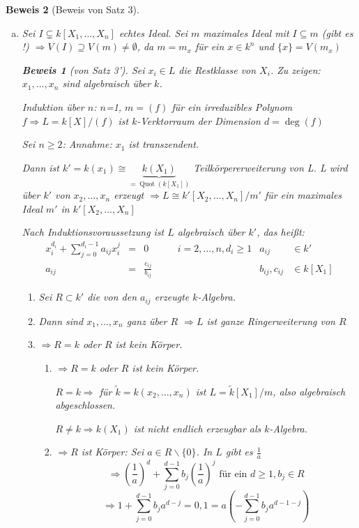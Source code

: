 \documentclass[a4paper, 12pt, numbers=noendperiod, chapterprefix=true]{scrbook}
\theoremstyle{break}
\theoremstyle{nonumberbreak}
\newtheorem{Bew}{Beweis}
\theoremstyle{nonumberplain}
\DeclareMathOperator{\Quot}{Quot}
\begin{document}
\begin{Bew}[Beweis von Satz 3]\begin{enumerate}[a)]
\item
	Sei $I\subsetneq k[X_1,\dots ,X_n]$ echtes Ideal. Sei $m$ maximales Ideal mit $I\subseteq m$ (gibt es !) $\Rightarrow V(I) \supseteq V(m) \neq \emptyset$, da $m=m_x$ f\"ur ein $x\in k^n$ und $\{x\}=V(m_x)$
	
	\begin{Bew}[von Satz 3']
	Sei $x_i\in L$ die Restklasse von $X_i$. \emph{Zu zeigen:} $x_1,\dots ,x_n$ sind algebraisch \"uber $k$.
	
	\emph{Induktion \"uber $n$:} $n$=1, $m=(f)$ f\"ur ein irreduzibles Polynom $f \Rightarrow L=k[X]/(f)$ ist $k$-Verktorraum der Dimension $d= \deg(f)$
	
	Sei $n\geq 2$: \emph{Annahme:} $x_1$ ist transzendent.
	
	Dann ist $k'=k(x_1) \cong \underbrace{k(X_1)}_{=\Quot{(k[X_1])}}$ Teilk\"orpererweiterung von L. L wird \"uber $k'$ von $x_2,\dots ,x_n$ erzeugt $\Rightarrow L \cong k'[X_2,\dots ,X_n]/m'$ f\"ur ein maximales Ideal $m'$ in $k'[X_2,\dots ,X_n]$
	
	Nach Induktionsvoraussetzung ist $L$ algebraisch \"uber $k'$, das hei\ss t:
	\[\begin{array}{rclccrl}
		x_i^{d_i} + \sum\limits_{j=0}^{d_i-1} a_{ij}x_i^j &=& 0 & \quad & i=2,\dots ,n, d_i \geq1 & a_{ij} &\in k'\\
		a_{ij} &=& \frac{c_{ij}}{b_{ij}} & \quad & & b_{ij}, c_{ij} &\in k[X_1]
	\end{array}\]
	\end{Bew}

	\begin{enumerate}[(1)]
	\item Sei $R\subset k'$ die von den $a_{ij}$ erzeugte $k$-Algebra.
	\item Dann sind $x_1,\dots ,x_n$ ganz \"uber $R$ $\Rightarrow L$ ist ganze Ringerweiterung von $R$
	\item $\Rightarrow R=k$ oder $R$ ist kein K\"orper.
	\begin{enumerate}[(1)]
	\item $\Rightarrow R=k$ oder $R$ ist kein K\"orper.
	
		$R=k \Rightarrow $ f\"ur $\tilde k=k(x_2,\dots ,x_n)$ ist $L= \tilde k[X_1]/m$, also algebraisch abgeschlossen.
		
		$R\neq k \Rightarrow k(X_1)$ ist nicht endlich erzeugbar als $k$-Algebra.
	\item $\Rightarrow R$ ist K\"orper: Sei $a\in R\backslash\{0\}$. In $L$ gibt es $\frac{1}{a}$
		\[\Rightarrow \left(\frac{1}{a}\right)^d+\sum_{j=0}^{d-1} b_j\left(\frac{1}{a} \right)^j\textrm{ f\"ur ein } d\geq1, b_j\in R\]
		\[\Rightarrow 1+\sum_{j=0}^{d-1} b_ja^{d-j} = 0, 1 = a\left( -\sum_{j=0}^{d-1}b_ja^{d-1-j} \right)\]
	\end{enumerate}\end{enumerate}
	

\end{enumerate}
\end{Bew}
\end{document}
